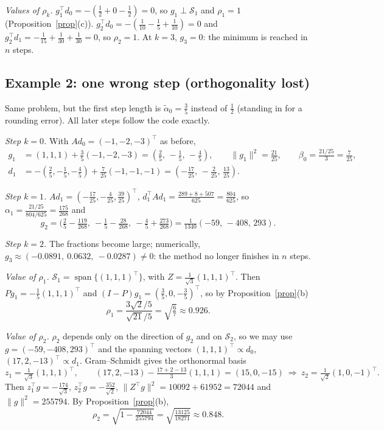 \documentclass[11pt]{article}
\theoremstyle{definition}
\newcommand{\spn}{\operatorname{span}}
\begin{document}
\emph{Values of $\rho_k$.} $g_1^{\top}d_0=-(\tfrac12+0-\tfrac12)=0$, so
$g_1\perp\mathcal S_1$ and $\rho_1=1$ (Proposition~\ref{prop}(c)).
$g_2^{\top}d_0=-(\tfrac1{10}-\tfrac15+\tfrac1{10})=0$ and
$g_2^{\top}d_1=-\tfrac1{15}+\tfrac1{30}+\tfrac1{30}=0$, so $\rho_2=1$.
At $k=3$, $g_3=0$: the minimum is reached in $n$ steps.

\subsection*{Example 2: one wrong step (orthogonality lost)}

Same problem, but the first step length is $\tilde\alpha_0=\tfrac35$ instead
of $\tfrac12$ (standing in for a rounding error). All later steps follow the
code exactly.

\emph{Step $k=0$.} With $Ad_0=(-1,-2,-3)^{\top}$ as before,
\begin{align*}
g_1&=(1,1,1)+\tfrac35(-1,-2,-3)=(\tfrac25,\,-\tfrac15,\,-\tfrac45),
  \qquad \|g_1\|^2=\tfrac{21}{25},\qquad \beta_0=\tfrac{21/25}{3}=\tfrac7{25},\\
d_1&=-(\tfrac25,-\tfrac15,-\tfrac45)+\tfrac7{25}(-1,-1,-1)
   =(-\tfrac{17}{25},\,-\tfrac2{25},\,\tfrac{13}{25}).
\end{align*}

\emph{Step $k=1$.} $Ad_1=(-\tfrac{17}{25},-\tfrac4{25},\tfrac{39}{25})^{\top}$,
$d_1^{\top}Ad_1=\tfrac{289+8+507}{625}=\tfrac{804}{625}$, so
$\alpha_1=\tfrac{21/25}{804/625}=\tfrac{175}{268}$ and
\[
g_2=\bigl(\tfrac25-\tfrac{119}{268},\ -\tfrac15-\tfrac{28}{268},\
-\tfrac45+\tfrac{273}{268}\bigr)
=\tfrac1{1340}(-59,\,-408,\,293).
\]

\emph{Step $k=2$.} The fractions become large; numerically,
$g_3\approx(-0.0891,\ 0.0632,\ -0.0287)\ne0$: the method no longer finishes
in $n$ steps.

\emph{Value of $\rho_1$.} $\mathcal S_1=\spn\{(1,1,1)^{\top}\}$, with
$Z=\tfrac1{\sqrt3}(1,1,1)^{\top}$. Then $Pg_1=-\tfrac15(1,1,1)^{\top}$ and
$(I-P)g_1=(\tfrac35,0,-\tfrac35)^{\top}$, so by Proposition~\ref{prop}(b)
\[
\rho_1=\frac{3\sqrt2/5}{\sqrt{21}/5}=\sqrt{\tfrac67}\approx0.926 .
\]

\emph{Value of $\rho_2$.} $\rho_2$ depends only on the direction of $g_2$ and
on $\mathcal S_2$, so we may use $g=(-59,-408,293)^{\top}$ and the spanning
vectors $(1,1,1)^{\top}\propto d_0$, $(17,2,-13)^{\top}\propto d_1$.
Gram--Schmidt gives the orthonormal basis
\[
z_1=\tfrac1{\sqrt3}(1,1,1)^{\top},\qquad
(17,2,-13)-\tfrac{17+2-13}{3}(1,1,1)=(15,0,-15)
\ \Rightarrow\ z_2=\tfrac1{\sqrt2}(1,0,-1)^{\top}.
\]
Then $z_1^{\top}g=-\tfrac{174}{\sqrt3}$, $z_2^{\top}g=-\tfrac{352}{\sqrt2}$,
$\|Z^{\top}g\|^2=10092+61952=72044$ and $\|g\|^2=255794$. By
Proposition~\ref{prop}(b),
\[
\rho_2=\sqrt{1-\tfrac{72044}{255794}}=\sqrt{\tfrac{13125}{18271}}\approx0.848 .
\]
\end{document}
